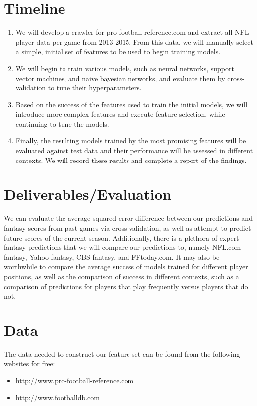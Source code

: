 \documentclass[11pt,a4paper]{article}
\begin{document}
\section{Timeline}
\begin{enumerate}[Week 1:]
  \item
  We will develop a crawler for pro-football-reference.com and extract all NFL player data per game from 2013-2015. From this data, we will manually select a simple, initial set of features to be used to begin training models.
  \item
  We will begin to train various models, such as neural networks, support vector machines, and naive bayesian networks, and evaluate them by cross-validation to tune their hyperparameters.
  \item
  Based on the success of the features used to train the initial models, we will introduce more complex features and execute feature selection, while continuing to tune the models.
  \item
  Finally, the resulting models trained by the most promising features will be evaluated against test data and their performance will be assessed in different contexts. We will record these results and complete a report of the findings.
\end{enumerate}

\section{Deliverables/Evaluation}
We can evaluate the average squared error difference between our predictions and fantasy scores from past games via cross-validation, as well as attempt to predict future scores of the current season. Additionally, there is a plethora of expert fantasy predictions that we will compare our predictions to, namely NFL.com fantasy, Yahoo fantasy, CBS fantasy, and FFtoday.com. It may also be worthwhile to compare the average success of models trained for different player positions, as well as the comparison of success in different contexts, such as a comparison of predictions for players that play frequently versus players that do not.

\section{Data}
The data needed to construct our feature set can be found from the following websites for free:
\begin{itemize}
\item
http://www.pro-football-reference.com
\item
http://www.footballdb.com
\end{itemize}
\end{document}
